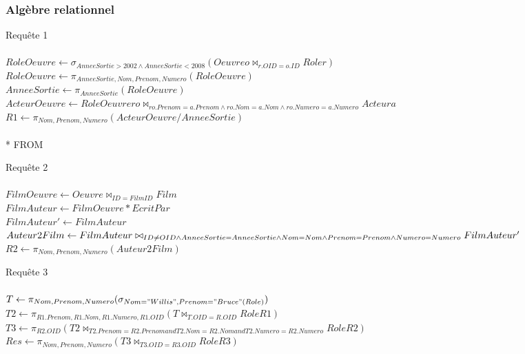 \documentclass[10pt,a4paper]{article}
\begin{document}
\subsubsection{Algèbre relationnel}
\begin{list}{*}{}
\item Requête 1
\\ \\
$
RoleOeuvre \leftarrow \sigma_{ AnneeSortie > 2002 \wedge AnneeSortie < 2008  } ( Oeuvre o \bowtie_{ r.OID = o.ID  } Role r) 
$\\$
RoleOeuvre \leftarrow \pi_{AnneeSortie, Nom, Prenom, Numero}(RoleOeuvre) $\\
$AnneeSortie \leftarrow \pi_{AnneeSortie}(RoleOeuvre)$\\
$ActeurOeuvre \leftarrow RoleOeuvre ro \bowtie_{ro.Prenom = a.Prenom \wedge ro.Nom = a. Nom \wedge ro.Numero = a.Numero} Acteur a $
\\
$R1 \leftarrow \pi_{Nom, Prenom, Numero}(ActeurOeuvre / AnneeSortie)$
\\
\\
	* FROM	\item Requête 2
\\ \\ 
$ FilmOeuvre \leftarrow Oeuvre \bowtie_{ID = FilmID} Film$ \\ 
$FilmAuteur \leftarrow FilmOeuvre*EcritPar$ \\
$FilmAuteur' \leftarrow FilmAuteur$\\
$Auteur2Film \leftarrow FilmAuteur \bowtie_{ID \neq OID \wedge \\
	AnneeSortie = AnneeSortie \wedge Nom = Nom \wedge Prenom = Prenom \wedge Numero = Numero} FilmAuteur'$\\
$R2 \leftarrow \pi_{Nom, Prenom, Numero} (Auteur2Film)$
\\
\item Requête 3
\\ \\ 
$ T \leftarrow \pi_{Nom, Prenom, Numero} (\sigma_{Nom = "Willis", Prenom = "Bruce"(Role)})$ \\
$ T2 \leftarrow \pi_{R1.Prenom, R1.Nom, R1.Numero, R1.OID} (T \bowtie_{T.OID = R.OID} Role R1 )$ \\
$ T3 \leftarrow  \pi_{R2.OID} (T2 \bowtie_{T2.Prenom = R2.Prenom and T2.Nom = R2.Nom and T2.Numero = R2.Numero} Role R2)$ \\
$ Res \leftarrow \pi_{Nom, Prenom, Numero} (T3 \bowtie_{T3.OID = R3.OID} Role R3)$
\\
\\

\end{list}
\end{document}
